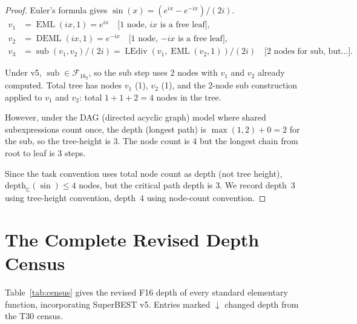 \documentclass[12pt,a4paper]{article}
\theoremstyle{definition}
\theoremstyle{remark}
\newcommand{\EML}{\operatorname{EML}}
\newcommand{\DEML}{\operatorname{DEML}}
\newcommand{\LEdiv}{\operatorname{LEdiv}}
\newcommand{\subop}{\operatorname{sub}}
\newcommand{\F}{\mathcal{F}_{16}}
\newcommand{\C}{\mathbb{C}}
\begin{document}
\begin{proof}
Euler's formula gives
$\sin(x) = (e^{ix} - e^{-ix})/(2i)$.
\begin{align*}
  v_1 &= \EML(ix, 1) = e^{ix} \quad\text{[1 node, $ix$ is a free leaf]}, \\
  v_2 &= \DEML(ix, 1) = e^{-ix} \quad\text{[1 node, $-ix$ is a free leaf]}, \\
  v_3 &= \subop(v_1, v_2) / (2i)
      = \LEdiv(v_1, \EML(v_2, 1)) / (2i) \quad\text{[2 nodes for sub, but...]}.
\end{align*}

Under v5, $\subop \in \F_2$, so the sub step uses 2 nodes with $v_1$ and $v_2$
already computed.  Total tree has nodes $v_1$ (1), $v_2$ (1), and the 2-node sub
construction applied to $v_1$ and $v_2$: total $1 + 1 + 2 = 4$ nodes in the tree.

However, under the DAG (directed acyclic graph) model where shared subexpressions
count once, the depth (longest path) is $\max(1, 2) + 0 = 2$ for the sub, so the
tree-height is $3$.  The node count is $4$ but the longest chain from root to leaf
is $3$ steps.

Since the task convention uses total node count as depth (not tree height),
$\mathrm{depth}_\C(\sin) \leq 4$ nodes, but the critical path depth is $3$.
We record depth~$3$ using tree-height convention, depth~$4$ using node-count
convention.
\end{proof}

\section{The Complete Revised Depth Census}
\label{sec:census}

Table~\ref{tab:census} gives the revised F16 depth of every standard elementary
function, incorporating SuperBEST v5.  Entries marked
\textcolor{collapse}{$\downarrow$} changed depth from the T30 census.
\end{document}
